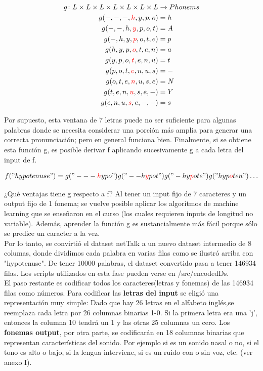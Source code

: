 \documentclass[paper=a4, fontsize=11pt]{scrartcl} %
\numberwithin{equation}{section} %
\numberwithin{figure}{section} %
\numberwithin{table}{section} %
\begin{document}
\begin{align*}
  g \colon L \times L \times L \times L \times L \times L \times L  & \to Phonems \\
  g(-,-,-,\textcolor{red}{h},y,p,o) &= h \\  
  g(-,-,h,\textcolor{red}{y},p,o,t) &= A \\
  g(-,h,y,\textcolor{red}{p},o,t,e) &= p \\
  g(h,y,p,\textcolor{red}{o},t,e,n) &= a \\
  g(y,p,o,\textcolor{red}{t},e,n,u) &= t \\
  g(p,o,t,\textcolor{red}{e},n,u,s)& = - \\
  g(o,t,e,\textcolor{red}{n},u,s,e)& = N \\
  g(t,e,n,\textcolor{red}{u},s,e,-)& = Y \\
  g(e,n,u,\textcolor{red}{s},e,-,-) &= s
\end{align*}

Por supuesto, esta ventana de 7 letras puede no ser suficiente para algunas palabras donde se necesita considerar una porción más amplia para generar una correcta pronunciación; pero en general funciona bien. Finalmente, si se obtiene esta función g, es posible derivar f aplicando sucesivamente g a cada letra del input de f. 

\begin{align*}
  f("hypotenuse") = g("---\textcolor{red}{h}ypo")  g("--h\textcolor{red}{y}pot") g("-hy\textcolor{red}{p}ote") g("hyp\textcolor{red}{o}ten")  \ldots
\end{align*}


¿Qué ventajas tiene g respecto a f? Al tener un input fijo de 7 caracteres y un output fijo de 1 fonema; se vuelve posible aplicar los algoritmos de machine learning que se enseñaron en el curso (los cuales requieren inputs de longitud no variable). Además, aprender la función g es sustancialmente más fácil porque sólo se predice un caracter a la vez. \\

Por lo tanto, se convirtió el dataset netTalk a un nuevo dataset intermedio de 8 columas, donde dividimos cada palabra en varias filas como se ilustró arriba con "hypotenuse". De tener 10000 palabras, el dataset convertido pasa a tener 146934 filas. Los scripts utilizados en esta fase pueden verse en /src/encodedDs. \\

El paso restante es codificar todos los caracteres(letras y fonemas) de las 146934 filas como números. Para codificar las \textbf{letras del input} se eligió una representación muy simple: Dado que hay 26 letras en el alfabeto inglés,se reemplaza cada letra por 26 columnas binarias 1-0. Si la primera letra era una 'j', entonces la columna 10 tendrá un 1 y las otras 25 columnas un cero. Los \textbf{fonemas output}, por otra parte, se codificarán en 18 columnas binarias que representan características del sonido. Por ejemplo si es un sonido nasal o no, si el tono es alto o bajo, si la lengua interviene, si es un ruido con o sin voz, etc. (ver anexo I). \\ 
\end{document}
